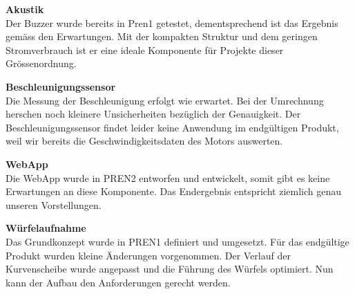 \documentclass[../../main.tex]{subfiles}
\begin{document}
\textbf{Akustik}\\
Der Buzzer wurde bereits in Pren1 getestet, dementsprechend ist das Ergebnis gemäss den Erwartungen. Mit der kompakten Struktur und dem geringen Stromverbrauch ist er eine ideale Komponente für Projekte dieser Grössenordnung.

\textbf{Beschleunigungssensor}\\
Die Messung der Beschleunigung erfolgt wie erwartet. Bei der Umrechnung herschen noch kleinere Unsicherheiten bezüglich der Genauigkeit. Der Beschleunigungssensor findet leider keine Anwendung im endgültigen Produkt, weil wir bereits die Geschwindigkeitsdaten des Motors auswerten.

\textbf{WebApp}\\
Die WebApp wurde in PREN2 entworfen und entwickelt, somit gibt es keine Erwartungen an diese Komponente. Das Endergebnis entspricht ziemlich genau unseren Vorstellungen.

\textbf{Würfelaufnahme}\\
Das Grundkonzept wurde in PREN1 definiert und umgesetzt. Für das endgültige Produkt wurden kleine Änderungen vorgenommen. Der Verlauf der Kurvenscheibe wurde angepasst und die Führung des Würfels optimiert. Nun kann der Aufbau den Anforderungen gerecht werden. 
\end{document}
